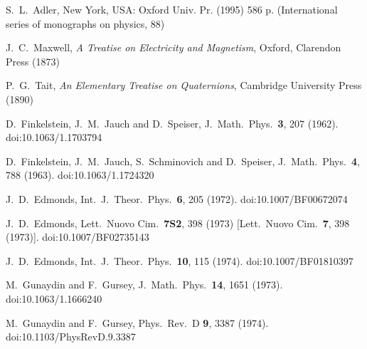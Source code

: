 \documentclass[epsfig,12pt]{article}
\begin{document}
\small
\begin{thebibliography}{99}
\itemsep -2pt

  S.~L.~Adler,
  New York, USA: Oxford Univ. Pr. (1995) 586 p. (International series of monographs on physics, 88)

  J.~C.~Maxwell,
  {\it A Treatise on Electricity and Magnetism},
  Oxford, Clarendon Press (1873)

  P.~G.~Tait,
  {\it An Elementary Treatise on Quaternions},
  Cambridge University Press (1890)

  D.~Finkelstein, J.~M.~Jauch and D.~Speiser,
  J.\ Math.\ Phys.\  {\bf 3}, 207 (1962).
  doi:10.1063/1.1703794

  D.~Finkelstein, J.~M.~Jauch, S.~Schminovich and D.~Speiser,
  J.\ Math.\ Phys.\  {\bf 4}, 788 (1963).
  doi:10.1063/1.1724320

  J.~D.~Edmonds,
  Int.\ J.\ Theor.\ Phys.\  {\bf 6}, 205 (1972).
  doi:10.1007/BF00672074

  J.~D.~Edmonds,
  Lett.\ Nuovo Cim.\  {\bf 7S2}, 398 (1973)
  [Lett.\ Nuovo Cim.\  {\bf 7}, 398 (1973)].
  doi:10.1007/BF02735143

  J.~D.~Edmonds,
  Int.\ J.\ Theor.\ Phys.\  {\bf 10}, 115 (1974).
  doi:10.1007/BF01810397

  M.~Gunaydin and F.~Gursey,
  J.\ Math.\ Phys.\  {\bf 14}, 1651 (1973).
  doi:10.1063/1.1666240

  M.~Gunaydin and F.~Gursey,
  Phys.\ Rev.\ D {\bf 9}, 3387 (1974).
  doi:10.1103/PhysRevD.9.3387


\end{thebibliography}
\end{document}
